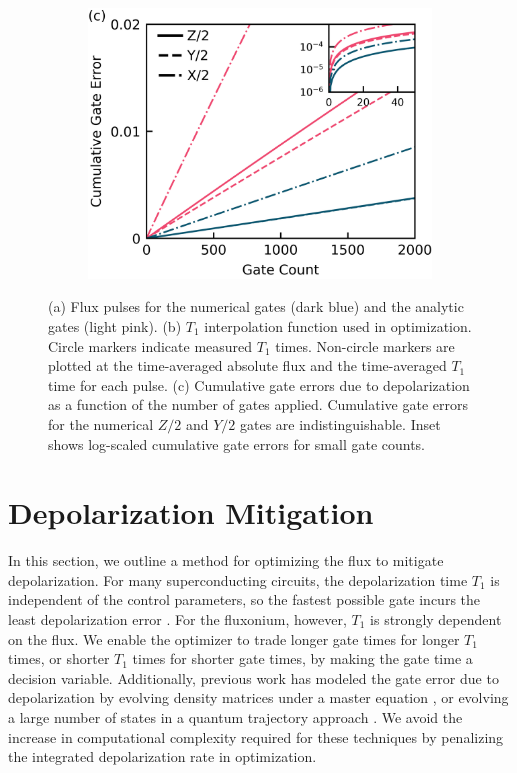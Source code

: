 \documentclass[
  amsfonts,
  amsmath,
  amssymb,
  pra,
  twocolumn,
  superscriptaddress,
]{revtex4-2}
\begin{document}
\begin{figure}[ht]
\begin{subfigure}{.23\textwidth}
    \caption{\label{fig:longitudeb}}
  \end{subfigure}\hfill
  \begin{subfigure}{.4\textwidth}
    \includegraphics[width=\linewidth]{f1c.png}
    \caption{\label{fig:longitudec}}
  \end{subfigure}
  \caption{
    (a) Flux pulses for the numerical gates (dark blue)
    and the analytic gates (light pink).
    (b) $T_{1}$ interpolation function used in optimization. Circle markers
    indicate measured $T_{1}$ times. Non-circle markers
    are plotted at the time-averaged 
    absolute flux and the time-averaged $T_{1}$ time for each pulse.
    (c) Cumulative gate errors due to depolarization as a function of the
    number of gates applied.
    Cumulative gate errors for the numerical $Z/2$ and $Y/2$ gates
    are indistinguishable. Inset shows log-scaled cumulative gate errors
    for small gate counts.
  }
  \label{fig:longitude}
\end{figure}


\section{Depolarization Mitigation\label{sec:longitude}}
In this section, we outline a method
for optimizing the flux to mitigate depolarization.
For many superconducting circuits, the depolarization time
$T_{1}$ is independent of the control parameters,
so the fastest possible gate incurs the least depolarization error
\cite{schulteherbruggen2011optimal}.
For the fluxonium, however, $T_{1}$ is strongly dependent on the flux.
We enable the optimizer to trade longer gate times
for longer $T_{1}$ times, or shorter $T_{1}$ times for shorter gate times,
by making the gate time a decision variable.
Additionally, previous work has modeled the gate error due to depolarization
by evolving density matrices under a master
equation \cite{rembold2020introduction, schulteherbruggen2011optimal},
or evolving a large number of states in a quantum trajectory approach
\cite{abdelhafez2019gradient}.
We avoid the increase in computational complexity required for these
techniques by penalizing the integrated depolarization rate in optimization.
\end{document}

